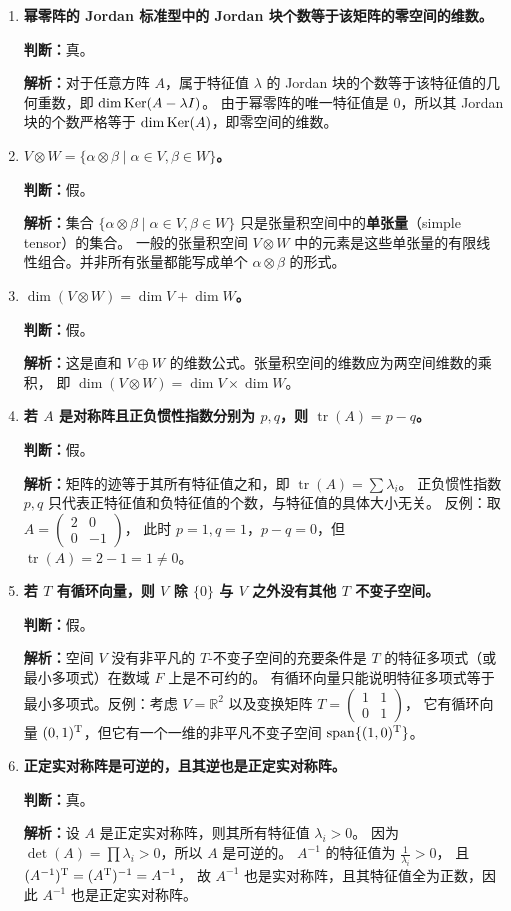 \begin{enumerate}
\item \textbf{幂零阵的 Jordan 标准型中的 Jordan 块个数等于该矩阵的零空间的维数。}

\textbf{判断：}真。

\textbf{解析：}对于任意方阵 $A$，属于特征值 $\lambda$ 的 Jordan 块的个数等于该特征值的几何重数，即 $\dim\operatorname{Ker}(A-\lambda I)$。
由于幂零阵的唯一特征值是 $0$，所以其 Jordan 块的个数严格等于 $\dim\operatorname{Ker}(A)$，即零空间的维数。

\item \textbf{$V\otimes W=\{\alpha\otimes\beta\mid\alpha\in V,\beta\in W\}$。}

\textbf{判断：}假。

\textbf{解析：}集合 $\{\alpha\otimes\beta\mid\alpha\in V,\beta\in W\}$ 只是张量积空间中的\textbf{单张量}（simple tensor）的集合。
一般的张量积空间 $V\otimes W$ 中的元素是这些单张量的有限线性组合。并非所有张量都能写成单个 $\alpha\otimes\beta$ 的形式。

\item \textbf{$\dim(V\otimes W)=\dim V+\dim W$。}

\textbf{判断：}假。

\textbf{解析：}这是直和 $V\oplus W$ 的维数公式。张量积空间的维数应为两空间维数的乘积，
即 $\dim(V\otimes W)=\dim V\times \dim W$。

\item \textbf{若 $A$ 是对称阵且正负惯性指数分别为 $p,q$，则 $\operatorname{tr}(A)=p-q$。}

\textbf{判断：}假。

\textbf{解析：}矩阵的迹等于其所有特征值之和，即 $\operatorname{tr}(A)=\sum\lambda_i$。
正负惯性指数 $p,q$ 只代表正特征值和负特征值的个数，与特征值的具体大小无关。
反例：取 $A=\begin{pmatrix}2&0\\0&-1\end{pmatrix}$，
此时 $p=1,q=1$，$p-q=0$，但 $\operatorname{tr}(A)=2-1=1\neq0$。

\item \textbf{若 $T$ 有循环向量，则 $V$ 除 $\{0\}$ 与 $V$ 之外没有其他 $T$ 不变子空间。}

\textbf{判断：}假。

\textbf{解析：}空间 $V$ 没有非平凡的 $T$-不变子空间的充要条件是 $T$ 的特征多项式（或最小多项式）在数域 $F$ 上是不可约的。
有循环向量只能说明特征多项式等于最小多项式。反例：考虑 $V=\mathbb{R}^2$ 以及变换矩阵 $T=\begin{pmatrix}1&1\\0&1\end{pmatrix}$，
它有循环向量 $(0,1)^{\rm T}$，但它有一个一维的非平凡不变子空间 $\operatorname{span}\{(1,0)^{\rm T}\}$。

\item \textbf{正定实对称阵是可逆的，且其逆也是正定实对称阵。}

\textbf{判断：}真。

\textbf{解析：}设 $A$ 是正定实对称阵，则其所有特征值 $\lambda_i>0$。
因为 $\det(A)=\prod\lambda_i>0$，所以 $A$ 是可逆的。
$A^{-1}$ 的特征值为 $\frac{1}{\lambda_i}>0$，
且 $(A^{-1})^{\rm T}=(A^{\rm T})^{-1}=A^{-1}$，
故 $A^{-1}$ 也是实对称阵，且其特征值全为正数，因此 $A^{-1}$ 也是正定实对称阵。
\end{enumerate}

